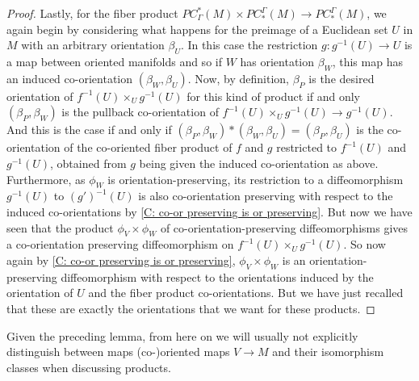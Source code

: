 \begin{proof}
	Lastly, for the fiber product $PC^*_\Gamma(M) \times PC_*^\Gamma(M) \to PC_*^\Gamma(M)$, we again begin by considering what happens for the preimage of a Euclidean set $U$ in $M$ with an arbitrary orientation $\beta_U$.
	In this case the restriction $g \colon g^{-1}(U) \to U$ is a map between oriented manifolds and so if $W$ has orientation $\beta_W$, this map has an induced co-orientation $(\beta_W, \beta_U)$.
	Now, by definition, $\beta_P$ is the desired orientation of $f^{-1}(U) \times_U g^{-1}(U)$ for this kind of product if and only $(\beta_P,\beta_W)$ is the pullback co-orientation of $f^{-1}(U) \times_U g^{-1}(U) \to g^{-1}(U)$. And this is the case if and only if $(\beta_P,\beta_W)*(\beta_W,\beta_U) = (\beta_P, \beta_U)$ is the co-orientation of the co-oriented fiber product of $f$ and $g$ restricted to $f^{-1}(U)$ and $g^{-1}(U)$, obtained from $g$ being given the induced co-orientation as above.
	Furthermore, as $\phi_W$ is orientation-preserving, its restriction to a diffeomorphism $g^{-1}(U)$ to $(g')^{-1}(U)$ is also co-orientation preserving with respect to the induced co-orientations by \cref{C: co-or preserving is or preserving}.
	But now we have seen that the product $\phi_V \times \phi_W$ of co-orientation-preserving diffeomorphisms gives a co-orientation preserving diffeomorphism on $f^{-1}(U) \times_U g^{-1}(U)$.
	So now again by \cref{C: co-or preserving is or preserving}, $\phi_V \times \phi_W$ is an orientation-preserving diffeomorphism with respect to the orientations induced by the orientation of $U$ and the fiber product co-orientations.
	But we have just recalled that these are exactly the orientations that we want for these products.
\end{proof}

\begin{comment}
\begin{remark}\label{R: product preserves reverse}
	It is easy to modify the preceding arguments to show that if exactly one of $\phi_V \colon V \to V'$ or $\phi_W \colon W \to W'$ is an orientation- or co-orientation-\textit{reversing} diffeomorphism, then $\phi_V \times \phi_W$ restricts to a corresponding orientation- or co-orientation-\textit{reversing} diffeomorphism $V \times_M W \to V' \times_M W'$.
\end{remark}
\end{comment}

Given the preceding lemma, from here on we will usually not explicitly distinguish between maps (co\nobreakdash-)oriented maps $V \to M$ and their isomorphism classes when discussing products.






